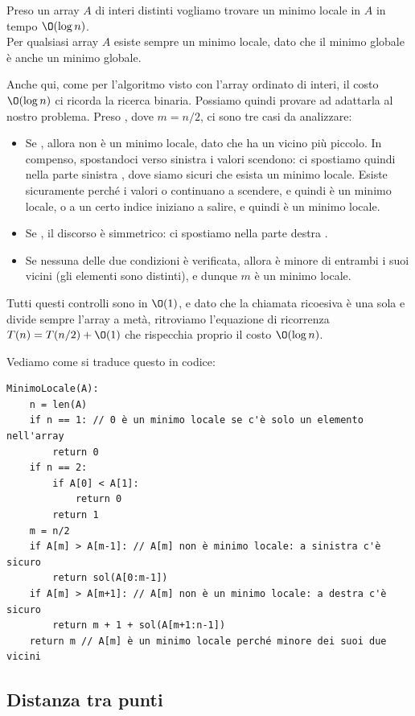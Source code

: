 \documentclass[11pt, a4paper, titlepage, oneside]{scrbook}
\begin{document}
Preso un array $A$ di interi distinti vogliamo trovare un minimo locale in $A$ in tempo $\O(\log n)$. \\
\NB Per qualsiasi array $A$ esiste sempre un minimo locale, dato che il minimo globale è anche un minimo globale.

Anche qui, come per l'algoritmo visto con l'array ordinato di interi, il costo $\O(\log n)$ ci ricorda la ricerca binaria. Possiamo quindi provare ad adattarla al nostro problema. Preso , dove $m = n/2$, ci sono tre casi da analizzare:
\begin{itemize}
    \item Se , allora  non è un minimo locale, dato che ha un vicino più piccolo. In compenso, spostandoci verso sinistra i valori scendono: ci spostiamo quindi nella parte sinistra , dove siamo sicuri che esista un minimo locale. Esiste sicuramente perché i valori o continuano a scendere, e quindi  è un minimo locale, o a un certo indice  iniziano a salire, e quindi  è un minimo locale.
    \item Se , il discorso è simmetrico: ci spostiamo nella parte destra .
    \item Se nessuna delle due condizioni è verificata, allora  è minore di entrambi i suoi vicini (gli elementi sono distinti), e dunque $m$ è un minimo locale.
\end{itemize}

Tutti questi controlli sono in $\O(1)$, e dato che la chiamata ricoesiva è una sola e divide sempre l'array a metà, ritroviamo l'equazione di ricorrenza $T(n) = T(n/2) + \O(1)$ che rispecchia proprio il costo $\O(\log n)$.

Vediamo come si traduce questo in codice:

\begin{lstlisting}
MinimoLocale(A):
    n = len(A)
    if n == 1: // 0 è un minimo locale se c'è solo un elemento nell'array 
        return 0
    if n == 2:
        if A[0] < A[1]:
            return 0
        return 1
    m = n/2
    if A[m] > A[m-1]: // A[m] non è minimo locale: a sinistra c'è sicuro
        return sol(A[0:m-1])
    if A[m] > A[m+1]: // A[m] non è un minimo locale: a destra c'è sicuro
        return m + 1 + sol(A[m+1:n-1]) 
    return m // A[m] è un minimo locale perché minore dei suoi due vicini
\end{lstlisting}

\subsection{Distanza tra punti}
\end{document}
